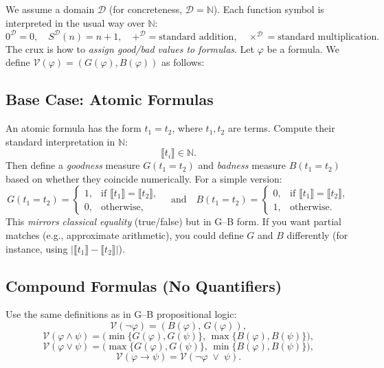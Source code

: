 \documentclass[11pt]{article}
\begin{document}
We assume a domain $\mathcal{D}$ (for concreteness, $\mathcal{D} = \mathbb{N}$). 
Each function symbol is interpreted in the usual way over $\mathbb{N}$:
\[
   0^\mathcal{D} = 0,\quad
   S^\mathcal{D}(n) = n+1,\quad
   +^\mathcal{D} = \text{standard addition},\quad
   \times^\mathcal{D} = \text{standard multiplication}.
\]
The crux is how to \emph{assign good/bad values to formulas}. Let $\varphi$ be a formula. 
We define $\mathcal{V}(\varphi) = (G(\varphi), B(\varphi))$ as follows:

\subsection{Base Case: Atomic Formulas}

An atomic formula has the form $t_1 = t_2$, where $t_1,t_2$ are terms. 
Compute their standard interpretation in $\mathbb{N}$:
\[
  \llbracket t_i \rrbracket \in \mathbb{N}.
\]
Then define a \emph{goodness} measure $G(t_1 = t_2)$ and \emph{badness} measure $B(t_1 = t_2)$ 
based on whether they coincide numerically. For a simple version:
\[
  G(t_1 = t_2) = 
     \begin{cases}
       1, & \text{if } \llbracket t_1 \rrbracket = \llbracket t_2 \rrbracket, \\
       0, & \text{otherwise},
     \end{cases}
  \quad\text{and}\quad
  B(t_1 = t_2) = 
     \begin{cases}
       0, & \text{if } \llbracket t_1 \rrbracket = \llbracket t_2 \rrbracket, \\
       1, & \text{otherwise}.
     \end{cases}
\]
This \emph{mirrors classical equality} (true/false) but in G--B form. 
If you want partial matches (e.g., approximate arithmetic), you could define 
$G$ and $B$ differently (for instance, using $| \llbracket t_1 \rrbracket - \llbracket t_2 \rrbracket |$).

\subsection{Compound Formulas (No Quantifiers)}

Use the same definitions as in G--B propositional logic:
\[
  \mathcal{V}(\lnot \varphi) = (B(\varphi),\, G(\varphi)),
\]
\[
  \mathcal{V}(\varphi \land \psi)
    = \bigl(\min\{G(\varphi),G(\psi)\},\,\max\{B(\varphi),B(\psi)\}\bigr),
\]
\[
  \mathcal{V}(\varphi \lor \psi)
    = \bigl(\max\{G(\varphi),G(\psi)\},\,\min\{B(\varphi),B(\psi)\}\bigr),
\]
\[
  \mathcal{V}(\varphi \to \psi)
    = \mathcal{V}(\lnot \varphi \;\lor\; \psi).
\]
\end{document}
